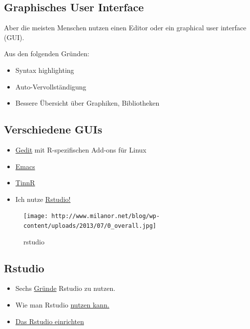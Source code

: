 \documentclass[]{article}
\providecommand{\tightlist}{%
  \setlength{\itemsep}{0pt}\setlength{\parskip}{0pt}}
\begin{document}
\subsection{Graphisches User
Interface}\label{graphisches-user-interface}

Aber die meisten Menschen nutzen einen Editor oder ein graphical user
interface (GUI).

Aus den folgenden Gründen:

\begin{itemize}
\tightlist
\item
  Syntax highlighting
\item
  Auto-Vervollständigung
\item
  Bessere Übersicht über Graphiken, Bibliotheken
\end{itemize}

\subsection{Verschiedene GUIs}\label{verschiedene-guis}

\begin{itemize}
\item
  \href{https://projects.gnome.org/gedit/}{Gedit} mit R-spezifischen
  Add-ons für Linux
\item
  \href{http://www.gnu.org/software/emacs/}{Emacs}
\item
  \href{http://www.sciviews.org/Tinn-R/}{TinnR}
\item
  Ich nutze \href{https://www.rstudio.com/}{Rstudio!}
\end{itemize}

\begin{figure}[htbp]
\centering
\texttt{[image: http://www.milanor.net/blog/wp-content/uploads/2013/07/0\_overall.jpg]}
\caption{rstudio}
\end{figure}

\subsection{Rstudio}\label{rstudio}

\begin{itemize}
\item
  Sechs
  \href{http://www.r-bloggers.com/top-6-reasons-you-need-to-be-using-rstudio/}{Gründe}
  Rstudio zu nutzen.
\item
  Wie man Rstudio
  \href{https://support.rstudio.com/hc/en-us/sections/200107586-Using-RStudio}{nutzen
  kann.}
\item
  \href{https://support.rstudio.com/hc/en-us/articles/200549016-Customizing-RStudio}{Das
  Rstudio einrichten}
\end{itemize}
\end{document}
